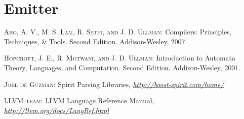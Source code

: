 \documentclass[a4paper,oneside,11pt]{book}
\theoremstyle{definition}
\begin{document}
\chapter{Emitter}

\clearpage
\begin{thebibliography}{4}

 \textsc{Aho, A. V., M. S. Lam, R. Sethi, and J. D. Ullman}:
Compilers: Principles, Techniques, \& Tools. Second Edition. Addison-Wesley, 2007.

 \textsc{Hopcroft, J. E., R. Motwani, and J. D. Ullman}:
Introduction to Automata Theory, Languages, and Computation. Second Edition. Addison-Wesley, 2001.

 \textsc{Joel de Guzman}:
Spirit Parsing Libraries,
\textit{\url{http://boost-spirit.com/home/}}

 \textsc{LLVM team}:
LLVM Language Reference Manual,
\textit{\url{http://llvm.org/docs/LangRef.html}}

\end{thebibliography}
\end{document}

